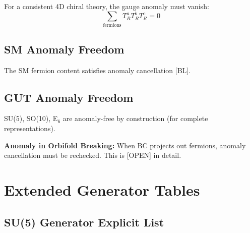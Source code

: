 \documentclass[11pt,a4paper]{article}
\begin{document}
For a consistent 4D chiral theory, the gauge anomaly must vanish:
\begin{equation}
  \sum_{\text{fermions}} T^a_R T^b_R T^c_R = 0
  \label{eq:app-anomaly}
\end{equation}

\subsection{SM Anomaly Freedom}

The SM fermion content satisfies anomaly cancellation [BL].

\subsection{GUT Anomaly Freedom}

SU(5), SO(10), E$_6$ are anomaly-free by construction (for complete representations).

\begin{openitembox}
\textbf{Anomaly in Orbifold Breaking:} When BC projects out fermions, anomaly
cancellation must be rechecked. This is [OPEN] in detail.
\end{openitembox}

\section{Extended Generator Tables}
\label{app:generators}

\subsection{SU(5) Generator Explicit List}
\end{document}
